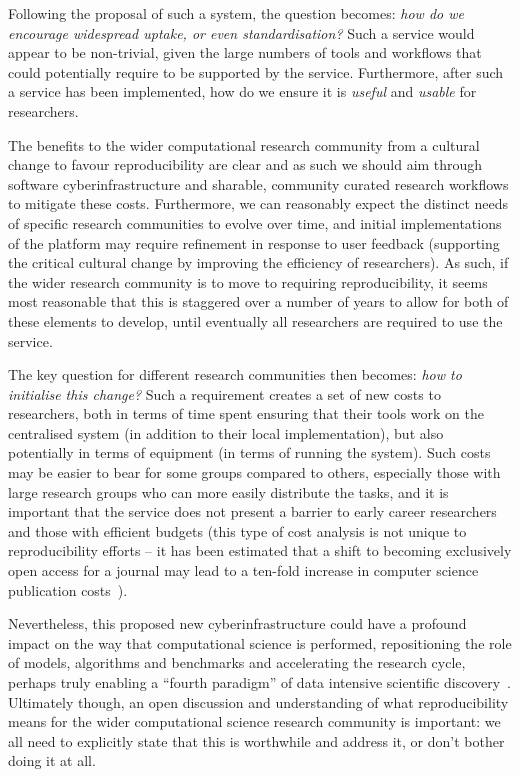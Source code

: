 \documentclass[a4paper,11pt]{article}
\begin{document}
Following the proposal of such a system, the question becomes:
{\emph{how do we encourage widespread uptake, or even
standardisation?}}  Such a service would appear to be non-trivial,
given the large numbers of tools and workflows that could potentially
require to be supported by the service. Furthermore, after such a
service has been implemented, how do we ensure it is \emph{useful} and
\emph{usable} for researchers.

The benefits to the wider computational research community from a
cultural change to favour reproducibility are clear and as such we
should aim through software cyberinfrastructure and sharable,
community curated research workflows to mitigate these
costs. Furthermore, we can reasonably expect the distinct needs of
specific research communities to evolve over time, and initial
implementations of the platform may require refinement in response to
user feedback (supporting the critical cultural change by improving
the efficiency of researchers). As such, if the wider research
community is to move to requiring reproducibility, it seems most
reasonable that this is staggered over a number of years to allow for
both of these elements to develop, until eventually all researchers
are required to use the service.

The key question for different research communities then becomes:
{\emph{how to initialise this change?}} Such a requirement creates a
set of new costs to researchers, both in terms of time spent ensuring
that their tools work on the centralised system (in addition to their
local implementation), but also potentially in terms of equipment (in
terms of running the system). Such costs may be easier to bear for
some groups compared to others, especially those with large research
groups who can more easily distribute the tasks, and it is important
that the service does not present a barrier to early career
researchers and those with efficient budgets (this type of cost
analysis is not unique to reproducibility efforts -- it has been
estimated that a shift to becoming exclusively open access for a
journal may lead to a ten-fold increase in computer science
publication costs~\cite{vardi-cacm-2014}).

Nevertheless, this proposed new cyberinfrastructure could have a
profound impact on the way that computational science is performed,
repositioning the role of models, algorithms and benchmarks and
accelerating the research cycle, perhaps truly enabling a ``fourth
paradigm'' of data intensive scientific discovery~\cite{hey:2009}.
Ultimately though, an open discussion and understanding of what
reproducibility means for the wider computational science research
community is important: we all need to explicitly state that this is
worthwhile and address it, or don't bother doing it at all.
\end{document}
